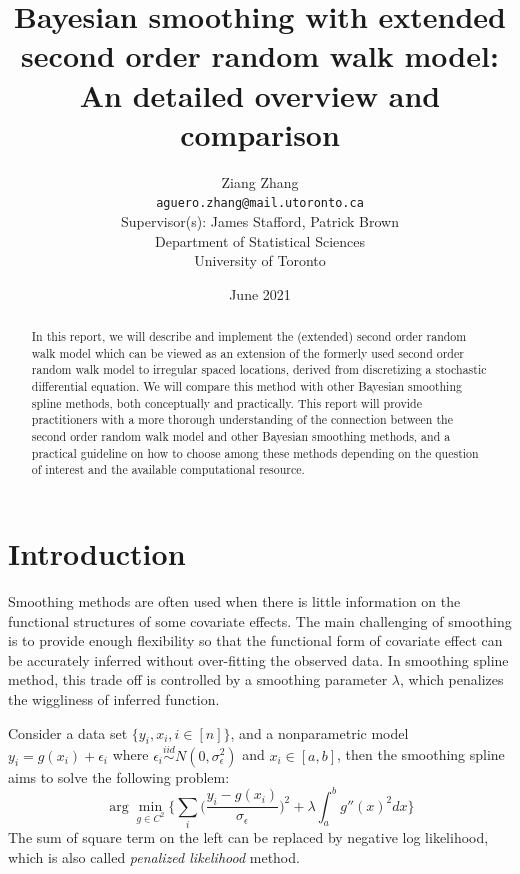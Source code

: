 \documentclass{article}
\title{\textbf{Bayesian smoothing with extended second order random walk model: An detailed overview and comparison}}
\author{
Ziang Zhang \\ \vspace{-0.3cm}\normalsize\texttt{aguero.zhang@mail.utoronto.ca}\\ 
\large
\vspace{0.5cm}
Supervisor(s): James Stafford, Patrick Brown \\ 

\vspace{0.5cm}
Department of Statistical Sciences \\
University of Toronto
}
\date{June 2021}
\begin{document}
\maketitle



\begin{abstract}
In this report, we will describe and implement the (extended) second order random walk model which can be viewed as an extension of the formerly used second order random walk model to irregular spaced locations, derived from discretizing a stochastic differential equation. We will compare this method with other Bayesian smoothing spline methods, both conceptually and practically. This report will provide practitioners with a more thorough understanding of the connection between the second order random walk model and other Bayesian smoothing methods, and a practical guideline on how to choose among these methods depending on the question of interest and the available computational resource.
\end{abstract}


\bigskip

\tableofcontents



\section{Introduction}\label{intro}

Smoothing methods are often used when there is little information on the functional structures of some covariate effects. The main challenging of smoothing is to provide enough flexibility so that the functional form of covariate effect can be accurately inferred without over-fitting the observed data. In smoothing spline method, this trade off is controlled by a smoothing parameter $\lambda$, which penalizes the wiggliness of inferred function. 

Consider a data set $\{y_i,x_i, i\in [n]\}$, and a nonparametric model $y_i = g(x_i) + \epsilon_i$ where $\epsilon_i \overset{iid}\sim N(0,\sigma_\epsilon^2)$ and $x_i \in [a,b]$, then the smoothing spline aims to solve the following problem:
\begin{equation}\label{equ:ss}
\arg\min_{g\in C^2} \bigg\{ \sum_i \bigg(\frac{y_i-g(x_i)}{\sigma_\epsilon}\bigg)^2 + \lambda  \int_a^b g''(x)^2 dx \bigg\}
\end{equation}
The sum of square term on the left can be replaced by negative log likelihood, which is also called \textit{penalized likelihood} method.
\end{document}
